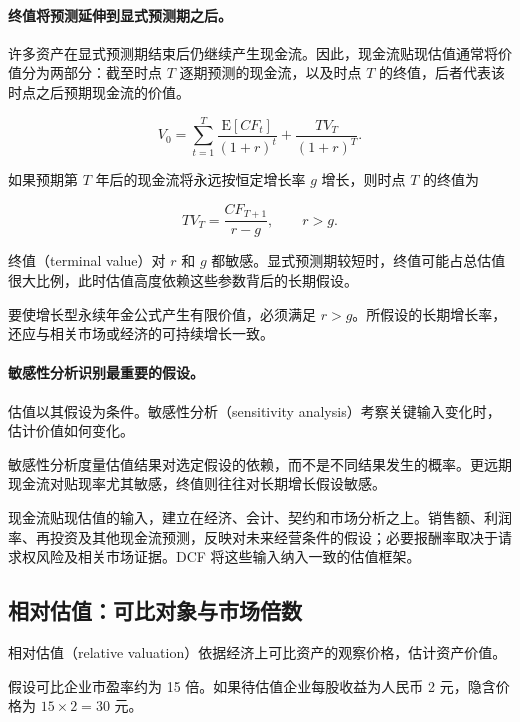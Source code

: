 \paragraph{终值将预测延伸到显式预测期之后。}

许多资产在显式预测期结束后仍继续产生现金流。因此，现金流贴现估值通常将价值分为两部分：截至时点 $T$ 逐期预测的现金流，以及时点 $T$ 的终值，后者代表该时点之后预期现金流的价值。

\begin{equation}
V_0=\sum_{t=1}^{T}
\frac{\mathrm{E}[CF_t]}{(1+r)^t}+\frac{TV_T}{(1+r)^T}.
\label{eq:ch5-dcf-terminal}
\end{equation}

如果预期第 $T$ 年后的现金流将永远按恒定增长率 $g$ 增长，则时点 $T$ 的终值为

\begin{equation}
TV_T=\frac{CF_{T+1}}{r-g},
\qquad r>g.
\label{eq:ch5-growing-perpetuity}
\end{equation}

终值（terminal value）对 $r$ 和 $g$ 都敏感。显式预测期较短时，终值可能占总估值很大比例，此时估值高度依赖这些参数背后的长期假设。

要使增长型永续年金公式产生有限价值，必须满足 $r>g$。所假设的长期增长率，还应与相关市场或经济的可持续增长一致。

\paragraph{敏感性分析识别最重要的假设。}

估值以其假设为条件。敏感性分析（sensitivity analysis）考察关键输入变化时，估计价值如何变化。

敏感性分析度量估值结果对选定假设的依赖，而不是不同结果发生的概率。更远期现金流对贴现率尤其敏感，终值则往往对长期增长假设敏感。

现金流贴现估值的输入，建立在经济、会计、契约和市场分析之上。销售额、利润率、再投资及其他现金流预测，反映对未来经营条件的假设；必要报酬率取决于请求权风险及相关市场证据。DCF 将这些输入纳入一致的估值框架。

\subsection{相对估值：可比对象与市场倍数}

相对估值（relative valuation）依据经济上可比资产的观察价格，估计资产价值。

假设可比企业市盈率约为 15 倍。如果待估值企业每股收益为人民币 2 元，隐含价格为 $15\times 2=30$ 元。

